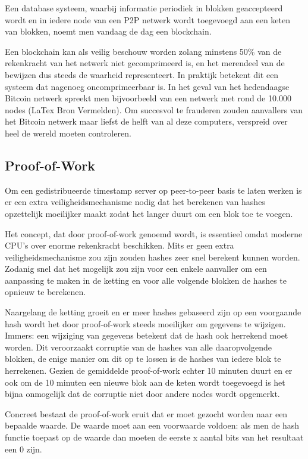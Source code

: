 	Een database systeem, waarbij informatie periodiek in blokken geaccepteerd wordt en in iedere node van een P2P netwerk wordt toegevoegd aan een keten van blokken, noemt men vandaag de dag een blockchain.
	
	Een blockchain kan als veilig beschouw worden zolang minstens 50\% van de rekenkracht van het netwerk niet gecomprimeerd is, en het merendeel van de bewijzen dus steeds de waarheid representeert. In praktijk betekent dit een systeem dat nagenoeg oncomprimeerbaar is. In het geval van het hedendaagse Bitcoin netwerk spreekt men bijvoorbeeld van een netwerk met rond de 10.000 nodes (LaTex Bron Vermelden). Om succesvol te frauderen zouden aanvallers van het Bitcoin netwerk maar liefst de helft van al deze computers, verspreid over heel de wereld moeten controleren. 
			
	\subsection{Proof-of-Work}
	\label{subsec:pow}
	Om een gedistribueerde timestamp server op peer-to-peer basis te laten werken is er een extra veiligheidsmechanisme nodig dat het berekenen van hashes opzettelijk moeilijker maakt zodat het langer duurt om een blok toe te voegen. 
	
	Het concept, dat door \textcite{Nakamoto2008} proof-of-work genoemd wordt, is essentieel omdat moderne CPU’s over enorme rekenkracht beschikken. Mits er geen extra veiligheidsmechanisme zou zijn zouden hashes zeer snel berekent kunnen worden. Zodanig snel dat het mogelijk zou zijn voor een enkele aanvaller om een aanpassing te maken in de ketting en voor alle volgende blokken de hashes te opnieuw te berekenen. 
	
	Naargelang de ketting groeit en er meer hashes gebaseerd zijn op een voorgaande hash wordt het door proof-of-work steeds moeilijker om gegevens te wijzigen. Immers: een wijziging van gegevens betekent dat de hash ook herrekend moet worden. Dit veroorzaakt corruptie van de hashes van alle daaropvolgende blokken, de enige manier om dit op te lossen is de hashes van iedere blok te herrekenen. 
	Gezien de gemiddelde proof-of-work echter 10 minuten duurt en er ook om de 10 minuten een nieuwe blok aan de keten wordt toegevoegd is het bijna onmogelijk dat de corruptie niet door andere nodes wordt opgemerkt.
	
	Concreet bestaat de proof-of-work eruit dat er moet gezocht worden naar een bepaalde waarde. De waarde moet aan een voorwaarde voldoen: als men de hash functie toepast op de waarde dan moeten de eerste x aantal bits van het resultaat een 0 zijn. 
	
